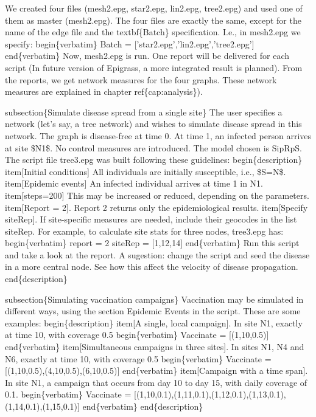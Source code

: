 \documentclass[a4paper,10pt]{manual}
\begin{document}
We created four files (mesh2.epg, star2.epg, lin2.epg, tree2.epg) and used one of them as master (mesh2.epg). The four files are exactly the same, except for the name of the edge file and the textbf\{Batch\} specification. I.e., in mesh2.epg we specify:
begin\{verbatim\}
Batch = {[}'star2.epg','lin2.epg','tree2.epg'{]}
end\{verbatim\}
Now, mesh2.epg is run. One report will be delivered for each script (In future version of Epigrass, a more integrated result is planned). From the reports, we get network measures for the four graphs. These network measures are explained in chapter ref\{cap:analysis\}).

subsection\{Simulate disease spread from a single site\}
The user specifies a network (let's say, a tree network) and wishes to simulate disease spread in this network. The graph is disease-free at time 0. At time 1, an infected person arrives at site \$N1\$. No control measures are introduced. The model chosen is SipRpS.
The script file tree3.epg was built following these guidelines:
begin\{description\}
item{[}Initial conditions{]} All individuals are initially susceptible, i.e.,  \$S=N\$.
item{[}Epidemic events{]} An infected individual arrives at time 1 in N1.
item{[}steps=200{]} This may be increased or reduced, depending on the parameters.
item{[}Report = 2{]}. Report 2 returns only the epidemiological results.
item{[}Specify siteRep{]}. If site-specific measures are needed, include their geocodes in the list siteRep. For example, to calculate site stats for three nodes, tree3.epg has:
begin\{verbatim\}
report = 2
siteRep = {[}1,12,14{]}
end\{verbatim\}
Run this script and take a look at the report. A sugestion: change the script and seed the disease in a more central node. See how this affect the velocity of disease propagation.
end\{description\}

subsection\{Simulating vaccination campaigns\}
Vaccination may be simulated in different ways, using the section Epidemic Events in the script. These are some examples:
begin\{description\}
item{[}A single, local campaign{]}.  In site N1, exactly at time 10, with coverage 0.5
begin\{verbatim\}
Vaccinate = {[}(1,10,0.5){]}
end\{verbatim\}
item{[}Simultaneous campaigns in three sites{]}.  In sites N1, N4 and N6, exactly at time 10, with coverage 0.5
begin\{verbatim\}
Vaccinate = {[}(1,10,0.5),(4,10,0.5),(6,10,0.5){]}
end\{verbatim\}
item{[}Campaign with a time span{]}.  In site N1, a campaign that occurs from day 10 to day 15, with daily coverage of 0.1.
begin\{verbatim\}
Vaccinate = {[}(1,10,0.1),(1,11,0.1),(1,12,0.1),(1,13,0.1),
(1,14,0.1),(1,15,0.1){]}
end\{verbatim\}
end\{description\}
\end{document}
